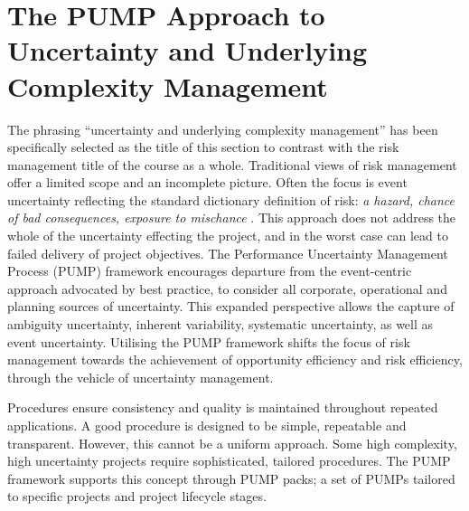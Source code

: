 
\section{The PUMP Approach to Uncertainty and Underlying Complexity Management}


The phrasing ``uncertainty and underlying complexity management'' has been specifically selected as the title of this section to contrast with the risk management title of the course as a whole.
Traditional views of risk management offer a limited scope and an incomplete picture.
Often the focus is event uncertainty reflecting the standard dictionary definition of risk: \textit{a hazard, chance of bad consequences, exposure to mischance} \citep{OED}.
This approach does not address the whole of the uncertainty effecting the project, and in the worst case can lead to failed delivery of project objectives.
The Performance Uncertainty Management Process (PUMP) framework encourages departure from the event-centric approach advocated by best practice, to consider all corporate, operational and planning sources of uncertainty.
This expanded perspective allows the capture of ambiguity uncertainty, inherent variability, systematic uncertainty, as well as event uncertainty.
Utilising the PUMP framework shifts the focus of risk management towards the achievement of opportunity efficiency and risk efficiency, through the vehicle of uncertainty management.

Procedures ensure consistency and quality is maintained throughout repeated applications.
A good procedure is designed to be simple, repeatable and transparent.
However, this cannot be a uniform approach.
Some high complexity, high uncertainty projects require sophisticated, tailored procedures.
The PUMP framework supports this concept through PUMP packs; a set of PUMPs tailored to specific projects and project lifecycle stages.

